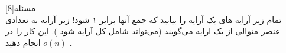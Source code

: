 ‌مسئله[8]  
\\
تمام زیر آرایه های یک آرایه را بیابید که جمع آنها برابر ۱ شود! زیر آرایه به تعدادی عنصر متوالی از یک ارایه می‌گویند (می‌تواند شامل کل آرایه شود ). این کار را در$ o(n)$ انجام دهید . 










